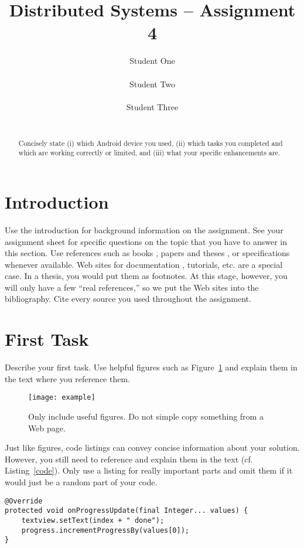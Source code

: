 \documentclass{report}
\title{Distributed Systems -- Assignment 4}
\author{
%
%
\alignauthor Student One\\
	\affaddr{ETH ID XX-XXX-XXX}\\
	\email{one@student.ethz.ch}
\alignauthor Student Two\\
	\affaddr{ETH ID XX-XXX-XXX}\\
	\email{two@student.ethz.ch}
\alignauthor Student Three\\
	\affaddr{ETH ID XX-XXX-XXX}\\
	\email{three@student.ethz.ch}
}
\newcommand{\lfig}[1]{\label{fig:#1}}
\newcommand{\rfig}[1]{Figure~\ref{fig:#1}}
\newcommand{\rlst}[1]{Listing~\ref{#1}}
\begin{document}
\maketitle

\begin{abstract}
Concisely state (i) which Android device you used, (ii) which tasks you completed and which are working correctly or limited, and (iii) what your specific enhancements are.
\end{abstract}

\section{Introduction}

Use the introduction for background information on the assignment.
See your assignment sheet for specific questions on the topic that you have to answer in this section.
Use references such as books \cite{hello}, papers and theses \cite{REST}, or specifications \cite{RFC2616} whenever available.
Web sites for documentation \cite{devServices}, tutorials, etc. are a special case.
In a thesis, you would put them as footnotes. At this stage, however, you will only have a few ``real references,'' so we put the Web sites into the bibliography.
Cite every source you used throughout the assignment.

\section{First Task}

Describe your first task. Use helpful figures such as \rfig{example} and explain them in the text where you reference them. 

\begin{figure}[h]
	\centering
    \texttt{[image: example]}
    \lfig{example}
    \vspace{-5mm} %
	\caption{Only include useful figures. Do not simple copy something from a Web page.}
\end{figure}

Just like figures, code listings can convey concise information about your solution.
However, you still need to reference and explain them in the text (cf. \rlst{code}).
Only use a listing for really important parts and omit them if it would just be a random part of your code.

\begin{lstlisting}
@Override
protected void onProgressUpdate(final Integer... values) {
	textview.setText(index + " done");
	progress.incrementProgressBy(values[0]);
}
\end{lstlisting}
\end{document}
